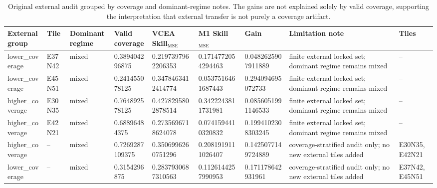 \begin{table}[t]
\centering
\scriptsize
\begin{tabular}{lllllllll}
\toprule
External group & Tile & Dominant regime & Valid coverage & VCEA Skill$_{\mathrm{MSE}}$ & M1 Skill$_{\mathrm{MSE}}$ & Gain & Limitation note & Tiles \\
\midrule
lower\_coverage & E37N42 & mixed & 0.389404296875 & 0.2197397962206353 & 0.1714772054294463 & 0.0482625907911889 & finite external locked set; dominant regime remains mixed & -- \\
lower\_coverage & E45N51 & mixed & 0.241455078125 & 0.3478463412414774 & 0.0537516461687443 & 0.294094695072733 & finite external locked set; dominant regime remains mixed & -- \\
higher\_coverage & E30N35 & mixed & 0.764892578125 & 0.4278295802878514 & 0.3422243811731981 & 0.0856051991146533 & finite external locked set; dominant regime remains mixed & -- \\
higher\_coverage & E42N21 & mixed & 0.68896484375 & 0.2735696718624078 & 0.0741594410320832 & 0.1994102308303245 & finite external locked set; dominant regime remains mixed & -- \\
higher\_coverage & -- & mixed & 0.7269287109375 & 0.3506996260751296 & 0.2081919111026407 & 0.1425077149724889 & coverage-stratified audit only; no new external tiles added & E30N35,E42N21 \\
lower\_coverage & -- & mixed & 0.3154296875 & 0.2837930687310563 & 0.1126144257990953 & 0.171178642931961 & coverage-stratified audit only; no new external tiles added & E37N42,E45N51 \\
\bottomrule
\end{tabular}
\caption{Original external audit grouped by coverage and dominant-regime notes. The gains are not explained solely by valid coverage, supporting the interpretation that external transfer is not purely a coverage artifact.}
\label{tab:e5_external_audit}
\end{table}
